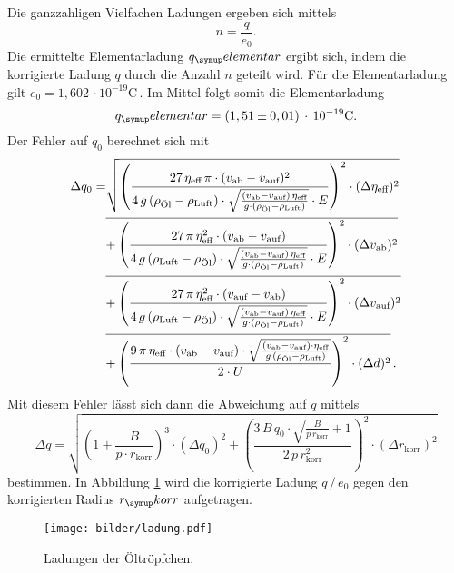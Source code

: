Die ganzzahligen Vielfachen Ladungen ergeben sich mittels
\begin{equation}
  n = \frac{q}{e_0}.
\end{equation}
Die ermittelte Elementarladung $q_\su{elementar}$ ergibt sich, indem die korrigierte Ladung $q$ durch die Anzahl $n$ geteilt wird. Für die Elementarladung gilt $e_0=1,602\,\cdot 10^{-19}\si{\coulomb}$\,\cite{el}.
Im Mittel folgt somit die Elementarladung
\begin{equation}
  q_\su{elementar} = (1,51\pm0,01)\,\cdot\,10^{-19}\si{\coulomb}.
\end{equation}
Der Fehler auf $q_0$ berechnet sich mit
\begin{align}
 \Delta q_\text{0} = &\sqrt{\left(
\frac{27\,\eta_\text{eff}\,\pi\cdot(v_\text{ab} -
v_\text{auf})^2}{4\,g\,(\rho_\text{Öl} - \rho_\text{Luft}) \cdot \sqrt{
\frac{(v_\text{ab} -
v_\text{auf})\,\eta_\text{eff}}{g\cdot(\rho_\text{Öl} -
\rho_\text{Luft})}} \cdot E} \right)^2 \cdot
(\Delta\eta_\text{eff})^2}\notag \\
 &\overline{+ \left( \frac{27\,\pi\,\eta_\text{eff}^2\cdot(v_\text{ab} -
v_\text{auf})}{4\,g\,(\rho_\text{Luft} - \rho_\text{Öl}) \cdot \sqrt{
\frac{(v_\text{ab} -
v_\text{auf})\,\eta_\text{eff}}{g\cdot(\rho_\text{Öl} -
\rho_\text{Luft})}} \cdot E} \right)^2 \cdot (\Delta
v_\text{ab})^2}\notag \\
 &\overline{+ \left( \frac{27\,\pi\,\eta_\text{eff}^2\cdot(v_\text{auf} -
v_\text{ab})}{4\,g\,(\rho_\text{Luft} - \rho_\text{Öl}) \cdot \sqrt{
\frac{(v_\text{ab} -
v_\text{auf})\,\eta_\text{eff}}{g\cdot(\rho_\text{Öl} -
\rho_\text{Luft})}} \cdot E}  \right)^2 \cdot (\Delta
v_\text{auf})^2}\notag \\
 &\overline{+ \left( \frac{9\,\pi\,\eta_\text{eff}\cdot(v_\text{ab} -
v_\text{auf})\cdot\sqrt{\frac{(v_\text{ab} -
v_\text{auf})\cdot\eta_\text{eff}}{g\,(\rho_\text{Öl} -
\rho_\text{Luft})}}}{2\cdot U}\right)^2 \cdot (\Delta d)^2}\,.
\end{align}
Mit diesem Fehler lässt sich dann die Abweichung auf $q$ mittels
\begin{equation}
 \Delta q = \sqrt{\left(1 + \frac{B}{p\cdot
r_\text{korr}}\right)^3 \cdot (\Delta q_\text{0})^2 +
\left(\frac{3\,B\,q_\text{0} \cdot \sqrt{\frac{B}{p\,r_\text{korr}} +
1}}{2\,p\,r_\text{korr}^2}\right)^2\cdot (\Delta r_\text{korr})^2}
\end{equation}
bestimmen.
In Abbildung \ref{fig:ladung} wird die korrigierte Ladung $q\,/\,e_0$ gegen
den korrigierten Radius $r_\su{korr}$ aufgetragen.
\begin{figure}[H]
  \centering
  \texttt{[image: bilder/ladung.pdf]}
  \caption{Ladungen der Öltröpfchen.}
  \label{fig:ladung}
\end{figure}

